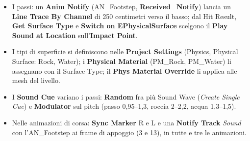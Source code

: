 \begin{itemize}
        personaggio, Use Pawn Control Rotation, Mesh a $-90$.
  \item I passi: un \textbf{Anim Notify} (AN\_Footstep, \textbf{Received\_Notify}) lancia
        un \textbf{Line Trace By Channel} di 250 centimetri verso il basso; dal Hit Result,
        \textbf{Get Surface Type} e \textbf{Switch on EPhysicalSurface} scelgono il
        \textbf{Play Sound at Location} sull'\textbf{Impact Point}.
  \item I tipi di superficie si definiscono nelle \textbf{Project Settings} (Physics,
        Physical Surface: Rock, Water); i \textbf{Physical Material} (PM\_Rock, PM\_Water)
        li assegnano con il Surface Type; il \textbf{Phys Material Override} li applica
        alle mesh del livello.
  \item I \textbf{Sound Cue} variano i passi: \textbf{Random} fra più Sound Wave
        (\emph{Create Single Cue}) e \textbf{Modulator} sul pitch (passo 0,95--1,3, roccia
        2--2,2, acqua 1,3--1,5).
  \item Nelle animazioni di corsa: \textbf{Sync Marker} R e L e una \textbf{Notify Track}
        \emph{Sound} con l'AN\_Footstep ai frame di appoggio (3 e 13), in tutte e tre le
        animazioni.
\end{itemize}
